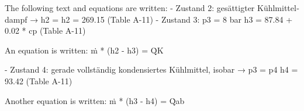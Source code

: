 The following text and equations are written:  
- Zustand 2: gesättigter Kühlmittel­dampf → h2 =  
  h2 = 269.15 (Table A-11)  
- Zustand 3: p3 = 8 bar  
  h3 = 87.84 + 0.02 * cp (Table A-11)  

An equation is written:  
ṁ * (h2 - h3) = Q̇K  

- Zustand 4: gerade vollständig kondensiertes Kühlmittel, isobar → p3 = p4  
  h4 = 93.42 (Table A-11)  

Another equation is written:  
ṁ * (h3 - h4) = Q̇ab